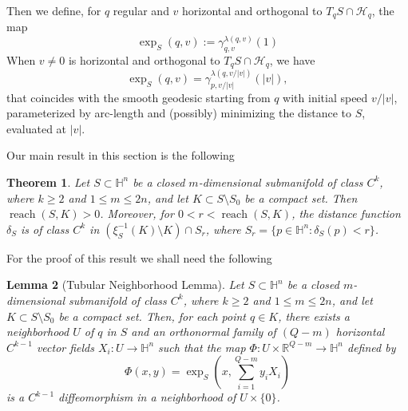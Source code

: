 \documentclass[10pt]{amsart}
\newtheorem{theorem}{Theorem}[section]
\newtheorem{lemma}[theorem]{Lemma}
\theoremstyle{definition}
\theoremstyle{remark}
\numberwithin{equation}{section}
\begin{document}
Then we define, for $q$ regular and $v$ horizontal and orthogonal to $T_qS\cap{\mathcal{H}}_q$, the map
\begin{equation}
\label{eq:exps}
\exp_S(q,v):={\gamma}_{q,v}^{{\lambda}(q,v)}(1)
\end{equation}
When $v\neq 0$ is horizontal and orthogonal to $T_qS\cap{\mathcal{H}}_q$, we have
\[
\exp_S(q,v)={\gamma}_{p,v/|v|}^{{\lambda}(q,v/|v|)}(|v|),
\]
that coincides with the smooth geodesic starting from $q$ with initial speed $v/|v|$, parameterized by arc-length and (possibly) minimizing the distance to $S$, evaluated at $|v|$.

Our main result in this section is the following

\begin{theorem}
\label{thm:tube}
Let $S\subset{{\mathbb{H}}}^n$ be a closed $m$-dimensional submanifold of class $C^k$, where $k{\geqslant} 2$ and $1{\leqslant} m{\leqslant} 2n$, and let $K\subset S\setminus S_0$ be a compact set. Then $\operatorname{reach}(S,K)>0$. Moreover, for $0<r<\operatorname{reach}(S,K)$, the distance function $\delta_S$ is of class $C^k$ in $(\xi_S^{-1}(K)\setminus K)\cap S_r$, where $S_r=\{p\in{{\mathbb{H}}}^n:\delta_S(p)<r\}$.
\end{theorem}

For the proof of this result we shall need the following

\begin{lemma}[Tubular Neighborhood Lemma]
\label{lem:tube}
Let $S\subset{{\mathbb{H}}}^n$ be a closed $m$-dimensio\-nal submanifold of class $C^k$, where $k{\geqslant} 2$ and $1{\leqslant} m{\leqslant} 2n$, and let $K\subset S\setminus S_0$ be a compact set. Then, for each point $q\in K$, there exists a neighborhood $U$ of $q$ in $S$ and an orthonormal family of $(Q-m)$ horizontal $C^{k-1}$ vector fields $X_i:U\to {{\mathbb{H}}}^n$ such that the map $\Phi:U\times{{\mathbb{R}}}^{Q-m}\to{{\mathbb{H}}}^n$ defined by 
\[
\Phi(x,y)=\exp_S(x,\sum_{i=1}^{Q-m} y_iX_i)
\]
is a $C^{k-1}$ diffeomorphism in a neighborhood of $U\times\{0\}$.
\end{lemma}
\end{document}
